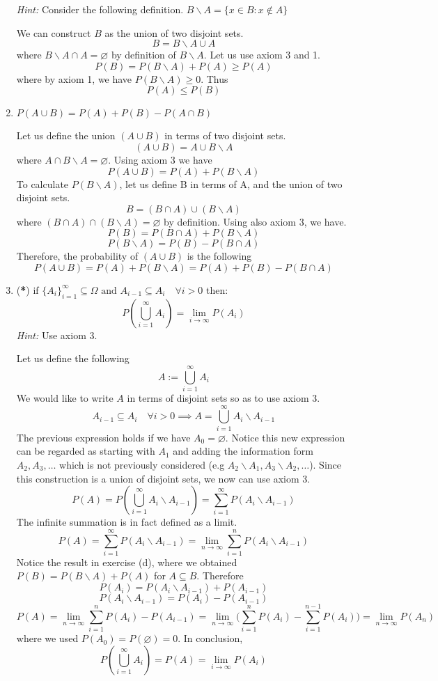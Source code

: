 \begin{enumerate}[label=\alph*.]
    \textit{Hint:} Consider the following definition. $B\backslash  A = \{x\in B: x\notin A\}$
    
We can construct $B$ as the union of two disjoint sets.
\[
B = B\backslash A \cup A
\]
where $B\backslash A \cap A = \varnothing$ by definition of $B\backslash A$. Let us use axiom 3 and 1.
\[
P(B) = P(B\backslash A) + P(A) \geq P(A)
\]
where by axiom 1, we have $P(B\backslash A) \geq 0$. Thus
\[
P(A) \leq P(B)
\]
    \item $P(A\cup B) = P(A) + P(B) - P(A\cap B)$

Let us define the union $(A\cup B)$ in terms of two disjoint sets.
\[
(A \cup B) = A \cup B\backslash A
\]
where $A \cap B\backslash A = \varnothing$. Using axiom 3 we have
\[
P(A \cup B) = P(A) + P(B\backslash A)
\]
To calculate $P(B\backslash A)$, let us define B in terms of A, and the union of two disjoint sets.
\[
B = (B \cap A) \cup (B\backslash A)
\]
where $(B \cap A) \cap (B\backslash A) = \varnothing$ by definition. Using also axiom 3, we have.
\[
P(B) = P(B \cap A) + P(B\backslash A)
\]
\[
P(B\backslash A) = P(B) - P(B \cap A)
\]
Therefore, the probability of $(A \cup B)$ is the following
\[
P(A \cup B) = P(A) + P(B\backslash A) = P(A) + P(B) - P(B \cap A)
\]
    \item (\textbf{*}) if $\{A_i\}_{i=1}^\infty \subseteq \Omega \text{ and } A_{i-1} \subseteq A_{i}\quad \forall i>0$ then:
\[
P\left(\bigcup_{i=1}^{\infty} A_{i}\right) = \lim_{i\xrightarrow{}\infty} P(A_i)
\]
\textit{Hint:} Use axiom 3.

Let us define the following
\[
A := \bigcup_{i=1}^{\infty} A_{i}
\]
We would like to write $A$ in terms of disjoint sets so as to use axiom 3.
\[
A_{i-1} \subseteq A_i \quad \forall i > 0 \implies A = \bigcup_{i=1}^{\infty} A_{i}\backslash A_{i-1}
\]
The previous expression holds if we have $A_{0} = \varnothing$. Notice this new expression can be regarded as starting with $A_1$ and adding the information form $A_2, A_3,\dots$ which is not previously considered (e.g $A_2 \backslash A_1, A_3 \backslash A_2, \dots$). Since this construction is a union of disjoint sets, we now can use axiom 3.
\[
P(A) = P\left(\bigcup_{i=1}^{\infty} A_{i}\backslash A_{i-1}\right) = \sum_{i=1}^\infty P(A_{i}\backslash A_{i-1})
\]
The infinite summation is in fact defined as a limit.
\[
P(A) = \sum_{i=1}^\infty P(A_{i}\backslash A_{i-1}) = \lim_{n\xrightarrow{}\infty} \sum_{i=1}^n P(A_{i}\backslash A_{i-1})
\]
Notice  the result in exercise (d), where we obtained $P(B) = P(B\backslash A) + P(A)$ for $A \subseteq B$. Therefore
\[
P(A_i) = P(A_{i}\backslash A_{i-1}) + P(A_{i-1})
\]
\[
 P(A_{i}\backslash A_{i-1}) = P(A_i) - P(A_{i-1})
\]
\[
P(A) = \lim_{n\xrightarrow{}\infty} \sum_{i=1}^n P(A_i) - P(A_{i-1}) = \lim_{n\xrightarrow{}\infty} \bigg(\sum_{i=1}^n P(A_i) - \sum_{i=1}^{n-1} P(A_{i})\bigg) = \lim_{n\xrightarrow{}\infty} P(A_n)
\]
where we used $P(A_0) = P(\varnothing) = 0$. In conclusion,
\[
P\left(\bigcup_{i=1}^{\infty} A_{i}\right) = P(A) = \lim_{i\xrightarrow{}\infty} P(A_i)
\]
\end{enumerate}


